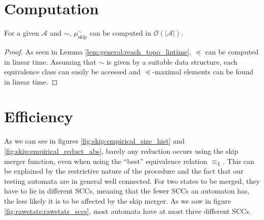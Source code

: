 \section{Computation}

\begin{lem}
\label{lem:skip:skip_aut_linear_time}
	For a given $\mathcal{A}$ and $\sim$, $\mu_\text{skip}^\sim$ can be computed in $\mathcal{O}(|\mathcal{A}|)$.
\end{lem}

\begin{proof}
	As seen in Lemma \ref{lem:general:reach_topo_lintime}, $\preceq$ can be computed in linear time. Assuming that $\sim$ is given by a suitable data structure, each equivalence class can easily be accessed and $\preceq$-maximal elements can be found in linear time.
\end{proof}





\section{Efficiency}
As we can see in figures \ref{fig:skip:empirical_size_hist} and \ref{fig:skip:empirical_reduct_abs}, barely any reduction occurs using the skip merger function, even when using the \enquote{best} equivalence relation $\equiv_L$. This can be explained by the restrictive nature of the procedure and the fact that our testing automata are in general well connected. For two states to be merged, they have to lie in different SCCs, meaning that the fewer SCCs an automaton has, the less likely it is to be affected by the skip merger. As we saw in figure \ref{fig:rawstats:rawstats_sccs}, most automata have at most three different SCCs.

